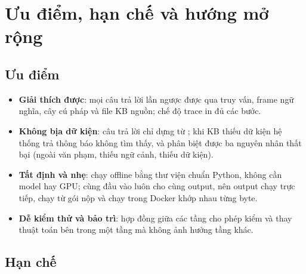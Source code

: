 \section{Ưu điểm, hạn chế và hướng mở rộng}
\label{sec:discussion}

\subsection{Ưu điểm}

\begin{itemize}
  \item \textbf{Giải thích được}: mọi câu trả lời lần ngược được qua truy vấn, frame
        ngữ nghĩa, cây cú pháp và file KB nguồn; chế độ trace in đủ các bước.
  \item \textbf{Không bịa dữ kiện}: câu trả lời chỉ dựng từ ; khi KB
        thiếu dữ kiện hệ thống trả thông báo không tìm thấy, và phân biệt được ba
        nguyên nhân thất bại (ngoài văn phạm, thiếu ngữ cảnh, thiếu dữ kiện).
  \item \textbf{Tất định và nhẹ}: chạy offline bằng thư viện chuẩn Python, không cần
        model hay GPU; cùng đầu vào luôn cho cùng output, nên output chạy trực tiếp, chạy
        từ gói nộp và chạy trong Docker khớp nhau từng byte.
  \item \textbf{Dễ kiểm thử và bảo trì}: hợp đồng giữa các tầng cho phép kiểm và thay
        thuật toán bên trong một tầng mà không ảnh hưởng tầng khác.
\end{itemize}

\subsection{Hạn chế}

